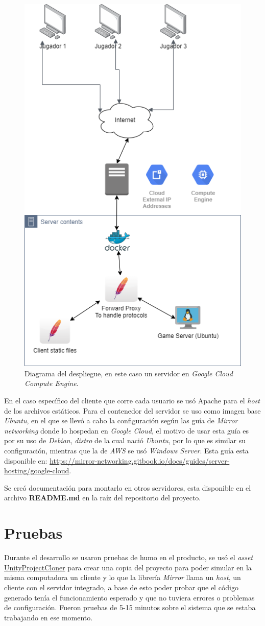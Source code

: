 \begin{figure}[H]
    \centering
    \includegraphics[width=0.5\linewidth]{images/diagrama_deployment.png}
    \caption{Diagrama del despliegue, en este caso un servidor en \textit{Google Cloud Compute Engine}.}
    \label{fig:diagrama_despliege}
\end{figure}

En el caso específico del cliente que corre cada usuario se usó Apache para el \textit{host} de los archivos estáticos.
Para el contenedor del servidor se uso como imagen base \textit{Ubuntu}, en el que se llevó a cabo la configuración según las guía de \textit{Mirror networking} donde lo hospedan en \textit{Google Cloud}, el motivo de usar esta guía es por su uso de \textit{Debian}, \textit{distro} de la cual nació \textit{Ubuntu}, por lo que es similar su configuración, mientras que la de \textit{AWS} se usó \textit{Windows Server}. Esta guía esta disponible en: \url{https://mirror-networking.gitbook.io/docs/guides/server-hosting/google-cloud}.

Se creó documentación para montarlo en otros servidores, esta disponible en el archivo \textbf{README.md} en la raíz del repositorio del proyecto.

\section{Pruebas}
Durante el desarrollo se usaron pruebas de humo en el producto, se usó el \textit{asset} \href{https://github.com/hwaet/UnityProjectCloner}{UnityProjectCloner} para crear una copia del proyecto para poder simular en la misma computadora un cliente y lo que la librería \textit{Mirror} llama un \textit{host}, un cliente con el servidor integrado, a base de esto poder probar que el código generado tenía el funcionamiento esperado y que no tuviera errores o problemas de configuración. Fueron pruebas de 5-15 minutos sobre el sistema que se estaba trabajando en ese momento.


